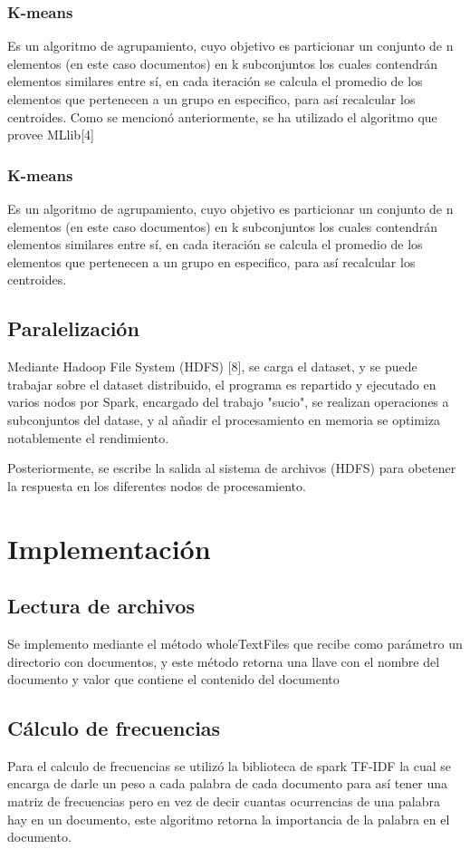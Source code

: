 \subsubsection{K-means}
Es un algoritmo de agrupamiento, cuyo objetivo es particionar un conjunto de n
elementos (en este caso documentos) en k subconjuntos los cuales contendrán
elementos similares entre sí, en cada iteración se calcula el promedio de
los elementos que pertenecen a un grupo en especifico, para así recalcular los centroides.
Como se mencionó anteriormente, se ha utilizado el algoritmo que provee MLlib[4]

\subsubsection{K-means}
Es un algoritmo de agrupamiento, cuyo objetivo es particionar un conjunto de n
elementos (en este caso documentos) en k subconjuntos los cuales contendrán
elementos similares entre sí, en cada iteración se calcula el promedio de
los elementos que pertenecen a un grupo en especifico, para así recalcular los centroides.

\subsection{Paralelización}
Mediante Hadoop File System (HDFS) [8], se carga el dataset, y se puede trabajar
sobre el dataset distribuido, el programa es repartido y ejecutado en varios nodos
por Spark, encargado del trabajo "sucio", se realizan operaciones a subconjuntos
del datase, y al añadir el procesamiento en memoria se optimiza notablemente
el rendimiento.

Posteriormente, se escribe la salida al sistema de archivos (HDFS) para obetener
la respuesta en los diferentes nodos de procesamiento.
\section{Implementación}
\subsection{Lectura de archivos}
Se implemento mediante el método wholeTextFiles que recibe como parámetro un directorio con documentos, y este método retorna una llave con el nombre del documento y valor que contiene el contenido del documento

\subsection{Cálculo de frecuencias}
Para el calculo de frecuencias se utilizó la biblioteca de spark TF-IDF
la cual se encarga de darle un peso a cada palabra de cada documento para así tener una matriz de frecuencias pero en vez de decir cuantas ocurrencias de una palabra hay en un documento, este algoritmo retorna la importancia de la
palabra en el documento.

